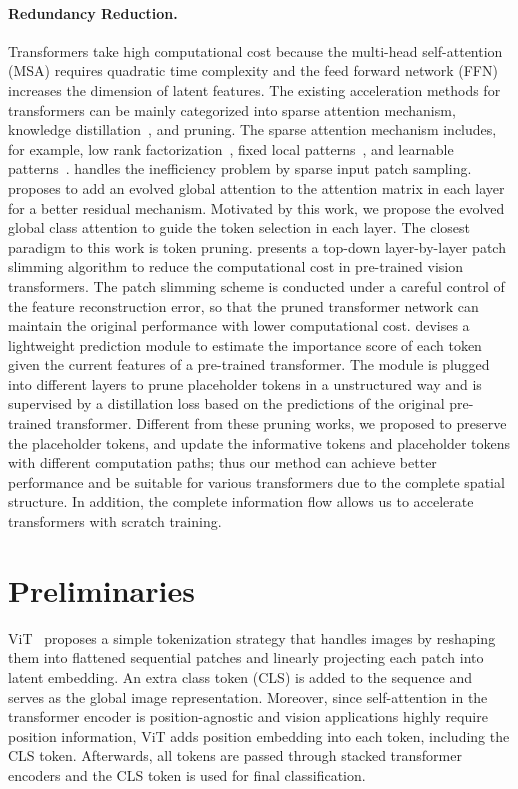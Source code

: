 \documentclass[letterpaper]{article} \usepackage{aaai22}  \usepackage{times}  \usepackage{helvet}  \usepackage{courier}  \usepackage[hyphens]{url}  \usepackage{graphicx} \urlstyle{rm} \def\UrlFont{\rm}  \usepackage{natbib}  \usepackage{caption} \DeclareCaptionStyle{ruled}{labelfont=normalfont,labelsep=colon,strut=off} \frenchspacing  \setlength{\pdfpagewidth}{8.5in}  \setlength{\pdfpageheight}{11in}  \usepackage{algorithm}
\begin{document}
\paragraph{Redundancy Reduction.}
Transformers take high computational cost because the multi-head self-attention (MSA) requires quadratic time complexity and the feed forward network (FFN) increases the dimension of latent features. 
The existing acceleration methods for transformers can be mainly categorized into sparse attention mechanism, knowledge distillation~\cite{distilbert}, and pruning.  The sparse attention mechanism includes, for example, low rank factorization~\cite{CoaT,Linformer}, fixed local patterns~\cite{SwinT}, and learnable patterns~\cite{Synthesizer,longformer}. \cite{PS-ViT-ICCV} handles the inefficiency problem by sparse input patch sampling.
\cite{Realformer} proposes to add an evolved global attention to the attention matrix in each layer for a better residual mechanism. Motivated by this work, we propose the evolved global class attention to guide the token selection in each layer.
The closest paradigm to this work is token pruning. \cite{PatchSlimming} presents a top-down layer-by-layer patch slimming algorithm to reduce the computational cost in pre-trained vision transformers. The patch slimming scheme is conducted under a careful control of the feature reconstruction error, so that the pruned transformer network can maintain the original performance with lower computational cost. \cite{DynamicViT} devises a lightweight prediction module to estimate the importance score of each token given the current features of a pre-trained transformer. The module is plugged into different layers to prune placeholder tokens in a unstructured way and is supervised by a distillation loss based on the predictions of the original pre-trained transformer. Different from these pruning works, we proposed to preserve the  placeholder tokens, and update the informative tokens and placeholder tokens with different computation paths; thus our method can achieve better performance and be suitable for various transformers due to the complete spatial structure. 
In addition, the complete information flow allows us to accelerate transformers  with scratch training.  
\section{Preliminaries}
\label{sec:background}


ViT~\cite{ViT} proposes a simple tokenization strategy that handles images by reshaping them into flattened sequential patches and linearly projecting each patch into latent embedding. An extra class token (CLS) is added to the sequence and serves as the global image representation. Moreover, since self-attention in the transformer encoder is position-agnostic and vision applications highly require position information, ViT adds position embedding into each token, including the CLS token. Afterwards, all tokens are passed through stacked transformer encoders and the CLS token is used for final classification.
\end{document}
